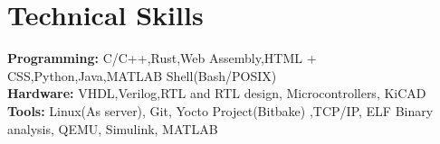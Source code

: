 \documentclass[a4paper,10pt]{article}
\begin{document}
\vspace{-.25cm} \section*{Technical Skills}
\textbf{Programming:}
C/C++,Rust,Web Assembly,HTML + CSS,Python,Java,MATLAB Shell(Bash/POSIX) \\ 
\textbf{Hardware:}
VHDL,Verilog,RTL and RTL design, Microcontrollers, KiCAD\\ \textbf{Tools:}
Linux(As server), Git, Yocto Project(Bitbake) ,TCP/IP,
ELF Binary analysis, QEMU, Simulink, MATLAB
\end{document}
